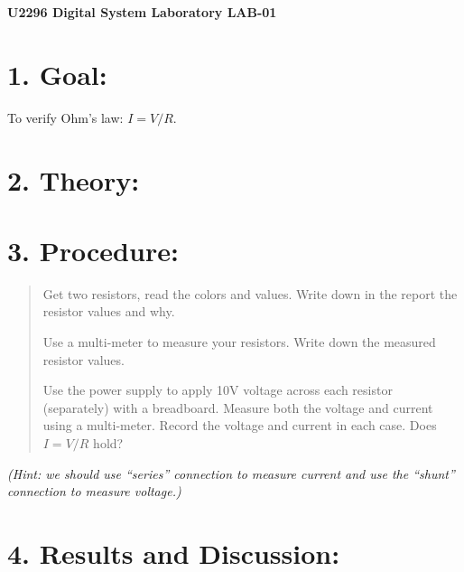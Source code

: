 \documentclass[a4paper, 12pt]{article}
\begin{document}
\begin{center}
    {\Large \textbf{U2296 Digital System Laboratory LAB-01}}
\end{center}


\section*{1. Goal:}
To verify Ohm's law: $I = V/R$.

\section*{2. Theory:}
\vspace{4em}

\section*{3. Procedure:}
\begin{quote}
    \item[Step 1:] Get two resistors, read the colors and values. Write down in the report the resistor values and why.
    \item[Step 2:] Use a multi-meter to measure your resistors. Write down the measured resistor values.
    \item[Step 3:] Use the power supply to apply 10V voltage across each resistor (separately) with a breadboard. Measure both the voltage and current using a multi-meter. Record the voltage and current in each case. Does $I = V/R$ hold?
\end{quote}

\vspace{0.5em}
\noindent\textit{(Hint: we should use ``series'' connection to measure current and use the ``shunt'' connection to measure voltage.)}

\section*{4. Results and Discussion:}
\vspace{6em}
\end{document}
